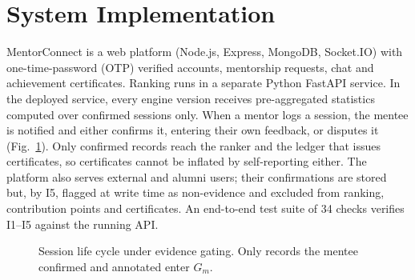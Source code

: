 \documentclass[conference]{IEEEtran}
\begin{document}
\section{System Implementation}
\label{sec:system}
MentorConnect is a web platform (Node.js, Express, MongoDB, Socket.IO) with one-time-password (OTP) verified accounts, mentorship requests, chat and achievement certificates. Ranking runs in a separate Python FastAPI service. In the deployed service, every engine version receives pre-aggregated statistics computed over confirmed sessions only. When a mentor logs a session, the mentee is notified and either confirms it, entering their own feedback, or disputes it (Fig.~\ref{fig:gate}). Only confirmed records reach the ranker and the ledger that issues certificates, so certificates cannot be inflated by self-reporting either. The platform also serves external and alumni users; their confirmations are stored but, by I5, flagged at write time as non-evidence and excluded from ranking, contribution points and certificates. An end-to-end test suite of 34 checks verifies I1--I5 against the running API.

\begin{figure}[t]
\centering
{}
\caption{Session life cycle under evidence gating. Only records the mentee confirmed and annotated enter $G_m$.}
\label{fig:gate}
\end{figure}
\end{document}
